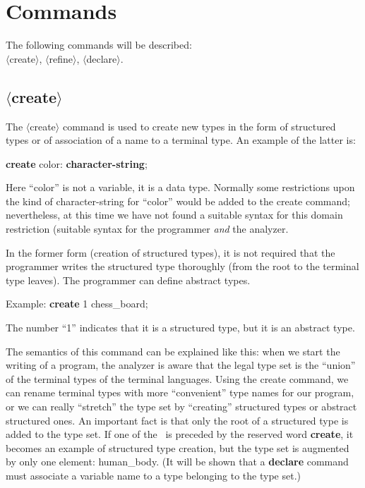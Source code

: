 \documentclass[openany,nobib]{tufte-book}
\newcommand{\kw}[1]{{\bf #1}}
\newcommand{\sym}[1]{$\langle$#1$\rangle$}
\begin{document}
\section{Commands}

\medskip\noindent
The following commands will be described:\\
\-\hspace{1cm}\sym{create}, \sym{refine}, \sym{declare}.

\subsection{\sym{create}}

The \sym{create} command is used to create new types in the form of structured
types or of association of a name to a terminal type. An example of the latter
is:

\medskip

\-\hspace{2cm} \kw{create} color: \kw{character-string};

\medskip

\noindent Here ``color'' is not a variable, it is a data type. Normally some
restrictions upon the kind of character-string for ``color'' would be added to
the create command;\autocite{hoare1972chapter} nevertheless, at this time we
have not found a suitable syntax for this domain restriction (suitable syntax
for the programmer {\sl and} the analyzer.

In the former form (creation of structured types), it is not required that the
programmer writes the structured type thoroughly (from the root to the terminal
type leaves). The programmer can define abstract types.

Example: \kw{create} 1 chess\_board;

The number ``1'' indicates that it is a structured type, but it is an abstract
type.

The semantics of this command can be explained like this: when we start the
writing of a program, the analyzer is aware that the legal type set is the
``union'' of the terminal types of the terminal languages. Using the create
command, we can rename terminal types with more ``convenient'' type names for
our program, or we can really ``stretch'' the type set by ``creating''
structured types or abstract structured ones. An important fact is that only
the root of a structured type is added to the type set. If one of
the~ is preceded by the reserved word
\kw{create}, it becomes an example of structured type creation, but the type
set is
augmented by only one element: human\_body. (It will be shown that a
\kw{declare} command must associate a variable name to a type belonging to the
type
set.)
\end{document}
